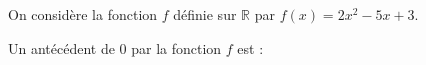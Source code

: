 
On considère la fonction $f$ définie sur $\mathbb{R}$ par $f(x)=2x^2-5x+3$.

Un antécédent de $0$ par la fonction $f$ est :

\smallskip

